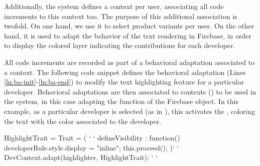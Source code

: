 Additionally, the system defines a context per user, associating all code increments to this context too. 
The purpose of this additional association is twofold. On one hand, we use it to select product 
variants per user. On the other hand, it is used to adapt the behavior of the text rendering in Firebase, 
in order to display the colored layer indicating the contributions for each developer.

All code increments are recorded as part of a behavioral adaptation associated to a context. The 
following code snippet defines the behavioral adaptation (Lines \ref{ln:ba-init}-\ref{ln:ba-end}) to modify 
the text highlighting feature for a particular developer. Behavioral adaptations are then
associated to contexts () to be used in the system, in this case adapting the 
 function of the  Firebase object. In this example, as a 
particular developer is selected (as in ), this activates the , 
coloring the text with the color associated to the developer.
\begin{ctxtraits}[numbers=left]
 HighlightTrait = Trait = ({ ` \label{ln:ba-init} `
   defineVisibility : function() {
     developerRule.style.display = "inline";
     this.proceed();
   }
 })` \label{ln:ba-end} `
 DevContext.adapt(highlighter, HighlightTrait); ` \label{ln:association} `
\end{ctxtraits}


\endinput
